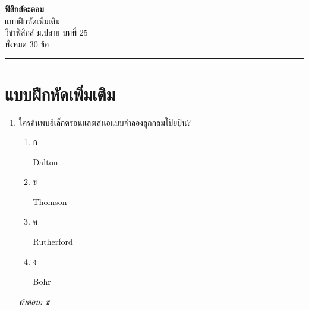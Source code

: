 \documentclass[12pt]{article}
\begin{document}
\begin{center}
{\Large\textbf{ฟิสิกส์อะตอม}}\\[6pt]
{\normalsize แบบฝึกหัดเพิ่มเติม}\\[6pt]
{\normalsize วิชาฟิสิกส์ ม.ปลาย บทที่ 25}\\[4pt]
{\footnotesize ทั้งหมด 30 ข้อ}
\end{center}
\hrule
\bigskip

\section*{แบบฝึกหัดเพิ่มเติม}
\begin{enumerate}[label=\arabic*., itemsep=0.5\baselineskip, topsep=0.5\baselineskip, leftmargin=*]
\item ใครค้นพบอิเล็กตรอนและเสนอแบบจำลองลูกกลมโป้ยปุ้น?
\begin{enumerate}[label=\alph*)., itemsep=0.3\baselineskip, topsep=0.3\baselineskip]
\item ก\ 
\begin{minipage}[t]{0.9\linewidth}
\raggedright Dalton
\end{minipage}
\item ข\ 
\begin{minipage}[t]{0.9\linewidth}
\raggedright Thomson
\end{minipage}
\item ค\ 
\begin{minipage}[t]{0.9\linewidth}
\raggedright Rutherford
\end{minipage}
\item ง\ 
\begin{minipage}[t]{0.9\linewidth}
\raggedright Bohr
\end{minipage}
\end{enumerate}
\vspace{-0.3\baselineskip}
\begin{small}
\textit{คำตอบ: ข}
\end{small}


\end{enumerate}
\end{document}
